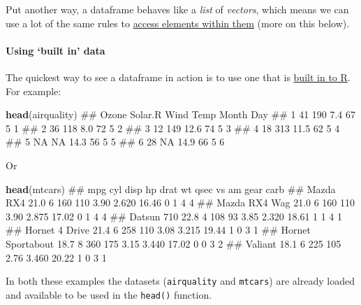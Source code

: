 \documentclass[]{article}
\newenvironment{Shaded}{\begin{snugshade}}{\end{snugshade}}
\newcommand{\KeywordTok}[1]{\textcolor[rgb]{0.13,0.29,0.53}{\textbf{#1}}}
\newcommand{\NormalTok}[1]{#1}
\let\oldparagraph\paragraph
\renewcommand{\paragraph}[1]{\oldparagraph{#1}\mbox{}}
\theoremstyle{definition}
\theoremstyle{definition}
\theoremstyle{definition}
\theoremstyle{remark}
\begin{document}
Put another way, a dataframe behaves like a \emph{list} of
\emph{vectors}, which means we can use a lot of the same rules to
\protect\hyperlink{access-vector-elements}{access elements within them}
(more on this below).

\paragraph{\texorpdfstring{Using `built in'
data}{Using built in data}}\label{built-in-data}

The quickest way to see a dataframe in action is to use one that is
\href{https://stat.ethz.ch/R-manual/R-devel/library/datasets/html/00Index.html}{built
in to R}. For example:

\begin{Shaded}
\begin{Highlighting}[]
\KeywordTok{head}\NormalTok{(airquality)}
\NormalTok{##   Ozone Solar.R Wind Temp Month Day}
\NormalTok{## 1    41     190  7.4   67     5   1}
\NormalTok{## 2    36     118  8.0   72     5   2}
\NormalTok{## 3    12     149 12.6   74     5   3}
\NormalTok{## 4    18     313 11.5   62     5   4}
\NormalTok{## 5    NA      NA 14.3   56     5   5}
\NormalTok{## 6    28      NA 14.9   66     5   6}
\end{Highlighting}
\end{Shaded}

Or

\begin{Shaded}
\begin{Highlighting}[]
\KeywordTok{head}\NormalTok{(mtcars)}
\NormalTok{##                    mpg cyl disp  hp drat    wt  qsec vs am gear carb}
\NormalTok{## Mazda RX4         21.0   6  160 110 3.90 2.620 16.46  0  1    4    4}
\NormalTok{## Mazda RX4 Wag     21.0   6  160 110 3.90 2.875 17.02  0  1    4    4}
\NormalTok{## Datsun 710        22.8   4  108  93 3.85 2.320 18.61  1  1    4    1}
\NormalTok{## Hornet 4 Drive    21.4   6  258 110 3.08 3.215 19.44  1  0    3    1}
\NormalTok{## Hornet Sportabout 18.7   8  360 175 3.15 3.440 17.02  0  0    3    2}
\NormalTok{## Valiant           18.1   6  225 105 2.76 3.460 20.22  1  0    3    1}
\end{Highlighting}
\end{Shaded}

In both these examples the datasets (\texttt{airquality} and
\texttt{mtcars}) are already loaded and available to be used in the
\texttt{head()} function.
\end{document}
